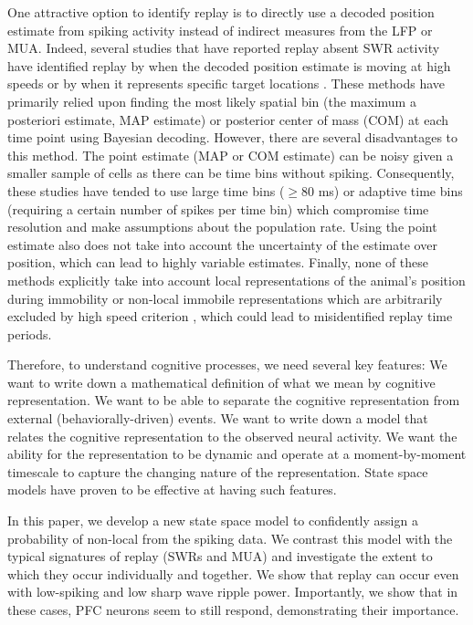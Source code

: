 \documentclass[11pt]{article}
\begin{document}
One attractive option to identify replay is to directly use a decoded position estimate from spiking activity instead of indirect measures from the LFP or MUA. Indeed, several studies that have reported replay absent SWR activity have identified replay by when the decoded position estimate is moving at high speeds \cite{KaeferReplayBehavioralSequences2020,WidloskiFlexiblereroutinghippocampal2022,WidloskiReplaysharpwave2025} or by when it represents specific target locations \cite{CoulterClosedloopmodulationremote2025}. These methods have primarily relied upon finding the most likely spatial bin (the maximum a posteriori estimate, MAP estimate) or posterior center of mass (COM) at each time point using Bayesian decoding. However, there are several disadvantages to this method. The point estimate (MAP or COM estimate) can be noisy given a smaller sample of cells as there can be time bins without spiking. Consequently, these studies have tended to use large time bins ($\geq$80 ms) or adaptive time bins (requiring a certain number of spikes per time bin) which compromise time resolution and make assumptions about the population rate. Using the point estimate also does not take into account the uncertainty of the estimate over position, which can lead to highly variable estimates. Finally, none of these methods explicitly take into account local representations of the animal’s position during immobility or non-local immobile representations which are arbitrarily excluded by high speed criterion \cite{YuDistincthippocampalcorticalmemory2017,DenovellisHippocampalreplayexperience2021}, which could lead to misidentified replay time periods.

Therefore, to understand cognitive processes, we need several key features: We want to write down a mathematical definition of what we mean by cognitive representation. We want to be able to separate the cognitive representation from external (behaviorally-driven) events. We want to write down a model that relates the cognitive representation to the observed neural activity. We want the ability for the representation to be dynamic and operate at a moment-by-moment timescale to capture the changing nature of the representation. State space models have proven to be effective at having such features.

In this paper, we develop a new state space model to confidently assign a probability of non-local from the spiking data. We contrast this model with the typical signatures of replay (SWRs and MUA) and investigate the extent to which they occur individually and together. We show that replay can occur even with low-spiking and low sharp wave ripple power. Importantly, we show that in these cases, PFC neurons seem to still respond, demonstrating their importance.
\end{document}
